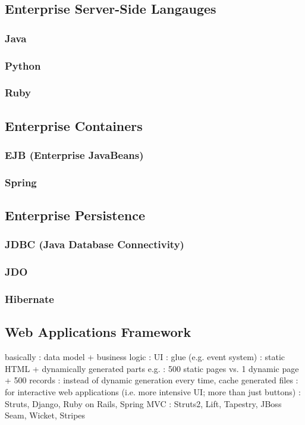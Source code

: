 \documentclass{myproc}
\begin{document}
\subsection{Enterprise Server-Side Langauges}
\subsubsection{Java}
\subsubsection{Python}
\subsubsection{Ruby}

\subsection{Enterprise Containers}
\subsubsection{EJB (Enterprise JavaBeans)}
\subsubsection{Spring}

\subsection{Enterprise Persistence}
\subsubsection{JDBC (Java Database Connectivity)}
\subsubsection{JDO}
\subsubsection{Hibernate}

\subsection{Web Applications Framework}
\bit
\w basically 
  \bit
  \w {}: data model + business logic
  \w {}: UI
  \w {}: glue (e.g. event system)
  \eit
\w {}
  \bit
  \w {}: static HTML + dynamically generated parts
     \bit
     \w e.g. : 500 static pages vs. 1 dynamic page + 500
  records
     \eit
  \w {}: instead of dynamic generation every time, cache generated
  files 
  \w {}
  \w {}
  \w {}: for interactive web applications (i.e. more intensive UI; more
  than just buttons)
  \w {}
  \eit
\w {}: Struts, Django, Ruby on Rails, Spring MVC
\w {}: Struts2, Lift,
  Tapestry, JBoss Seam, Wicket, Stripes 
\eit
\end{document}

